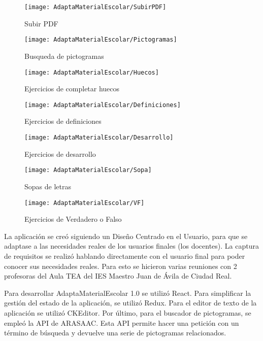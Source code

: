 \begin{figure}[ht!]
    \centering
    \texttt{[image:  AdaptaMaterialEscolar/SubirPDF]}
    \caption{Subir PDF}
    \label{SubirPDF}
\end{figure}
\begin{figure}[ht!]
    \centering
    \texttt{[image:  AdaptaMaterialEscolar/Pictogramas]}
    \caption{Busqueda de pictogramas}
    \label{Pictogramas}
\end{figure}
\begin{figure}[ht!]
    \centering
    \texttt{[image:  AdaptaMaterialEscolar/Huecos]}
    \caption{Ejercicios de completar huecos}
    \label{Huecos}
\end{figure}
\begin{figure}[ht!]
    \centering
    \texttt{[image:  AdaptaMaterialEscolar/Definiciones]}
    \caption{Ejercicios de definiciones}
    \label{Definiciones}
\end{figure}
\begin{figure}[ht!]
    \centering
    \texttt{[image:  AdaptaMaterialEscolar/Desarrollo]}
    \caption{Ejercicios de desarrollo}
    \label{Desarrollo}
\end{figure}
\begin{figure}[ht!]
    \centering
    \texttt{[image:  AdaptaMaterialEscolar/Sopa]}
    \caption{Sopas de letras}
    \label{Sopa}
\end{figure}
\begin{figure}[ht!]
    \centering
    \texttt{[image:  AdaptaMaterialEscolar/VF]}
    \caption{Ejercicios de Verdadero o Falso}
    \label{VF}
\end{figure}
La aplicación se creó siguiendo un Diseño Centrado en el Usuario, para que se adaptase a las necesidades reales de los usuarios finales (los docentes). La captura de requisitos se realizó hablando directamente con el usuario final para poder conocer sus necesidades reales. Para esto se hicieron varias reuniones con 2 profesoras del Aula TEA del IES Maestro Juan de Ávila de Ciudad Real.

Para desarrollar AdaptaMaterialEscolar 1.0 se utilizó React. Para simplificar la gestión del estado de la aplicación, se utilizó Redux. Para el editor de texto de la aplicación se utilizó CKEditor. Por último, para el buscador de pictogramas, se empleó la API de ARASAAC. Esta API permite hacer una petición con un término de búsqueda y devuelve una serie de pictogramas relacionados.

